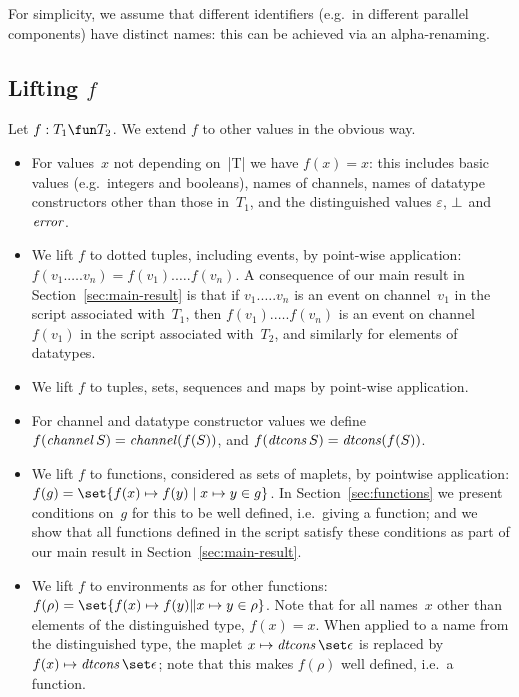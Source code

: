 For simplicity, we assume that different identifiers (e.g.~in different
parallel components) have distinct names: this can be achieved via an
alpha-renaming.



\subsection{Lifting $f$}
\label{sec:lifting-f}

Let $f : T_1 \fun T_2$.  We extend $f$ to other
values in the obvious way.
\begin{itemize}
\item For values~$x$ not depending on~|T| we have $f(x) = x$: this includes
  basic values (e.g.~integers and booleans), names of channels, names of
  datatype constructors other than those in~$T_1$, and the distinguished values
  $\varepsilon$, $\perp$ and $\mathord{\it error}$.

\item We lift $f$ to dotted tuples, including events, by point-wise
  application: $f(v_1.\ldots.v_n) = f(v_1).\ldots.f(v_n)$.  A consequence of
  our main result in Section~\ref{sec:main-result} is that if $v_1.\ldots.v_n$
  is an event on channel~$v_1$ in the script associated with~$T_1$, then
  $f(v_1).\ldots.f(v_n)$ is an event on channel~$f(v_1)$ in the script
  associated with~$T_2$, and similarly for elements of datatypes.

\item We lift $f$ to tuples, sets, sequences and maps by point-wise
  application.

\item For channel and datatype constructor values we define
  $f(\mathop{\it channel} S) = \mathop{\it channel} (f(S))$, and
  $f(\mathop{\it dtcons} S) = \mathop{\it dtcons} (f(S))$.

\item We lift $f$ to functions, considered as sets of maplets, by pointwise
  application: $f (g) = \set{ f(x) \mapsto f(y) \mid x \mapsto y \in g }$.  In
  Section~\ref{sec:functions} we present conditions on~$g$ for this to be well
  defined, i.e.~giving a function; and we show that all functions defined in
  the script satisfy these conditions as part of our main result in
  Section~\ref{sec:main-result}. 

\item We lift $f$ to environments as for other functions: $f(\rho) =
  \set{{f(x) \mapsto f(y)} \| x \mapsto y \in \rho}$.  Note that for all
  names~$x$ other than elements of the distinguished type, $f(x) = x$.  When
  applied to a name from the distinguished type, the maplet $x \mapsto
  \dtcons\set\epsilon$ is replaced by $f(x) \mapsto \dtcons\set\epsilon$; note
  that this makes $f(\rho)$ well defined, i.e.~a function.


\end{itemize}
